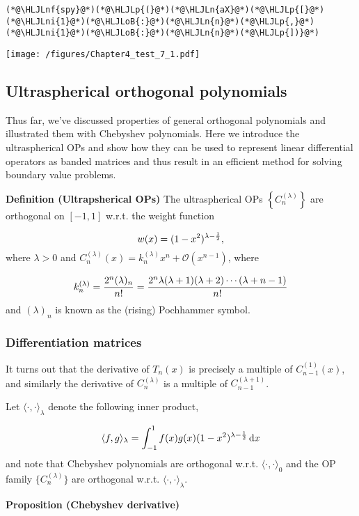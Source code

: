 \documentclass[12pt,a4paper]{article}
\newcommand{\HLJLn}[1]{#1}
\newcommand{\HLJLnf}[1]{\textcolor[RGB]{66,102,213}{#1}}
\newcommand{\HLJLni}[1]{\textcolor[RGB]{59,151,46}{#1}}
\newcommand{\HLJLoB}[1]{\textcolor[RGB]{102,102,102}{\textbf{#1}}}
\newcommand{\HLJLp}[1]{#1}
\begin{document}
\begin{lstlisting}
(*@\HLJLnf{spy}@*)(*@\HLJLp{(}@*)(*@\HLJLn{aX}@*)(*@\HLJLp{[}@*)(*@\HLJLni{1}@*)(*@\HLJLoB{:}@*)(*@\HLJLn{n}@*)(*@\HLJLp{,}@*)(*@\HLJLni{1}@*)(*@\HLJLoB{:}@*)(*@\HLJLn{n}@*)(*@\HLJLp{])}@*)
\end{lstlisting}

\texttt{[image: /figures/Chapter4\_test\_7\_1.pdf]}

\subsection{Ultraspherical orthogonal polynomials}
Thus far, we've discussed properties of general orthogonal polynomials and illustrated them with Chebyshev polynomials.  Here we introduce the ultraspherical OPs and show how they can be used to represent linear differential operators as banded matrices and thus result in an efficient method for solving boundary value problems.

\textbf{Definition (Ultrapsherical OPs)} The ultraspherical OPs $\left\lbrace C_n^{(\lambda)} \right\rbrace$ are orthogonal on $[-1, 1]$ w.r.t. the weight function

\[
w(x) = (1-x^2)^{\lambda - {1\over 2}},
\]
where  $\lambda > 0$ and $C_n^{(\lambda)}(x) = k^{(\lambda)}_{n}x^n + \mathcal{O}(x^{n-1})$, where

\[
k_n^{(\lambda)} = {2^n (\lambda)_n \over n!} = {2^n \lambda (\lambda+1) (\lambda+2) \cdots (\lambda+n-1)  \over n!}
\]
and $(\lambda)_n$ is known as the (rising) Pochhammer symbol.

\subsubsection{Differentiation matrices}
It turns out that the derivative of $T_n(x)$ is precisely a multiple of  $C^{(1)}_{n-1}(x)$, and similarly the derivative of $C_n^{(\lambda)}$ is a multiple of $C_{n-1}^{(\lambda+1)}$.

Let $\langle \cdot, \cdot \rangle_{\lambda}$ denote the following inner product,

\[
\langle f, g \rangle_{\lambda} = \int_{-1}^{1} f(x) g(x) (1-x^2)^{\lambda - \frac{1}{2}}\,{\rm d}x
\]
and note that Chebyshev polynomials are orthogonal w.r.t. $\langle \cdot, \cdot \rangle_{0}$ and the OP family $\{ C_n^{(\lambda)}\}$ are orthogonal w.r.t. $\langle \cdot, \cdot \rangle_{\lambda}$.

\textbf{Proposition (Chebyshev derivative)}
\end{document}

